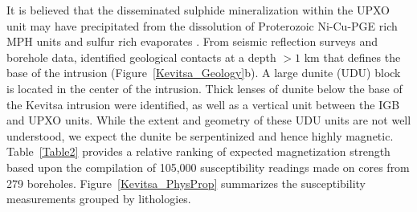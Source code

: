 \documentclass[paper]{geophysics}
\begin{document}
It is believed that the disseminated sulphide mineralization within the UPXO unit may have precipitated from the dissolution of Proterozoic Ni-Cu-PGE rich MPH units and sulfur rich evaporates \cite[]{Mutanen1997}. From seismic reflection surveys and borehole data, \cite{Koivisto2015} identified geological contacts at a depth $>1$ km that defines the base of the intrusion (Figure~\ref{Kevitsa_Geology}b).
A large dunite (UDU) block is located in the center of the intrusion. Thick lenses of dunite below the base of the Kevitsa intrusion were identified, as well as a vertical unit between the IGB and UPXO units. While the extent and geometry of these UDU units are not well understood, we expect the dunite be serpentinized and hence highly magnetic.
Table~\ref{Table2} provides a relative ranking of expected magnetization strength based upon the compilation of 105,000 susceptibility readings made on cores from 279 boreholes. Figure~\ref{Kevitsa_PhysProp} summarizes the susceptibility measurements grouped by lithologies.
\end{document}
